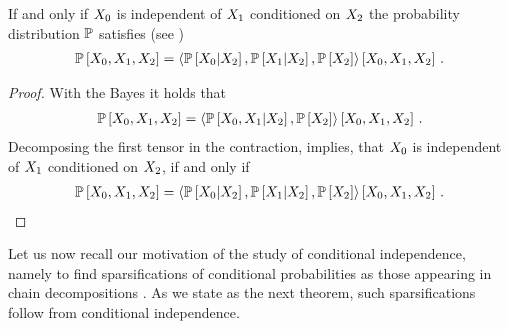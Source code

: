\begin{corollary}
    \label{cor:secCriterionCondIndepencence}
    If and only if $X_{0}$ is independent of $X_{1}$ conditioned on $X_{2}$ the probability distribution $\mathbb{P}$ satisfies (see )
    \begin{align*}
        \mathbb{P}\left[X_{0},X_{1},X_{2}\right]
        = \left\langle \mathbb{P}\left[X_{0}|X_{2}\right],\mathbb{P}\left[X_{1}|X_{2}\right],\mathbb{P}\left[X_{2}\right]\right\rangle \left[ X_{0},X_{1},X_{2} \right] \, .
    \end{align*}
\end{corollary}
\begin{proof}
    With the Bayes  it holds that
    \begin{align*}
        \mathbb{P}\left[X_{0},X_{1},X_{2}\right]
        = \left\langle \mathbb{P}\left[X_{0},X_{1}|X_{2}\right],\mathbb{P}\left[X_{2}\right]\right\rangle \left[ X_{0},X_{1},X_{2} \right] \, .
    \end{align*}
    Decomposing the first tensor in the contraction,  implies, that $X_{0}$ is independent of $X_{1}$ conditioned on $X_{2}$, if and only if
    \begin{align*}
        \mathbb{P}\left[X_{0},X_{1},X_{2}\right]
        = \left\langle \mathbb{P}\left[X_{0}|X_{2}\right],\mathbb{P}\left[X_{1}|X_{2}\right],\mathbb{P}\left[X_{2}\right]\right\rangle \left[ X_{0},X_{1},X_{2} \right] \, .
    \end{align*}
\end{proof}


Let us now recall our motivation of the study of conditional independence, namely to find sparsifications of conditional probabilities as those appearing in chain decompositions .
As we state as the next theorem, such sparsifications follow from conditional independence.

